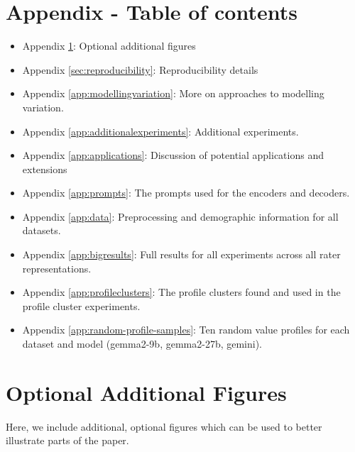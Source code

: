 \documentclass[11pt]{article}
\begin{document}
\section*{Appendix - Table of contents}
\begin{itemize}
\item Appendix \ref{app:adittionalfigures}: Optional additional figures
\item Appendix \ref{sec:reproducibility}: Reproducibility details
\item Appendix \ref{app:modellingvariation}: More on approaches to modelling variation.
\item Appendix \ref{app:additionalexperiments}: Additional experiments.
\item Appendix \ref{app:applications}: Discussion of potential applications and extensions
\item Appendix \ref{app:prompts}: The prompts used for the encoders and decoders.
\item Appendix \ref{app:data}: Preprocessing and demographic information for all datasets.
\item Appendix \ref{app:bigresults}: Full results for all experiments across all rater representations.
\item Appendix \ref{app:profileclusters}: The profile clusters found and used in the profile cluster experiments.
\item Appendix \ref{app:random-profile-samples}: Ten random value profiles for each dataset and model (gemma2-9b, gemma2-27b, gemini).

\end{itemize}

\section{Optional Additional Figures}
\label{app:adittionalfigures}

Here, we include additional, optional figures which can be used to better illustrate parts of the paper.
\end{document}
